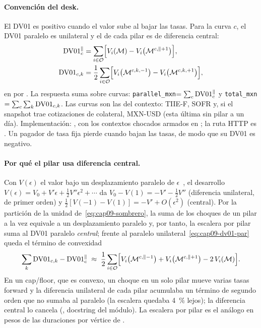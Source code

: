 \paragraph{Convención del desk.} El DV01 es positivo cuando el valor sube al bajar las tasas. Para la curva $c$, el DV01 paralelo es unilateral y el de cada pilar es de diferencia central:
\begin{align}
  \mathrm{DV01}^{\parallel}_c&=\sum_{i\in\mathcal O}\Bigl[V_i(\mathcal M)-V_i\bigl(\mathcal M^{c,\parallel+1}\bigr)\Bigr],\label{eq:cap09-dv01-par}\\
  \mathrm{DV01}_{c,k}&=\frac12\sum_{i\in\mathcal O}\Bigl[V_i\bigl(\mathcal M^{c,k,-1}\bigr)-V_i\bigl(\mathcal M^{c,k,+1}\bigr)\Bigr],\label{eq:cap09-dv01-pilar}
\end{align}
en \MXN{} por \pb. La respuesta suma sobre curvas: \texttt{parallel\_mxn}$=\sum_c\mathrm{DV01}^{\parallel}_c$ y \texttt{total\_mxn}$=\sum_c\sum_k\mathrm{DV01}_{c,k}$. Las curvas son las del contexto: TIIE-F, SOFR y, si el snapshot trae cotizaciones de colateral, MXN-USD (esta última sin pilar a un día). Implementación: , con los contextos chocados armados en ; la ruta HTTP es . Un pagador de tasa fija pierde cuando bajan las tasas, de modo que su DV01 es negativo.

\paragraph{Por qué el pilar usa diferencia central.} Con $V(\epsilon)$ el valor bajo un desplazamiento paralelo de $\epsilon$~\pb, el desarrollo $V(\epsilon)=V_0+V'\epsilon+\tfrac12V''\epsilon^2+\cdots$ da $V_0-V(1)=-V'-\tfrac12V''$ (diferencia unilateral, de primer orden) y $\tfrac12[V(-1)-V(1)]=-V'+O(\epsilon^2)$ (central). Por la partición de la unidad de~\eqref{eq:cap09-sombrero}, la suma de los choques de un pilar a la vez equivale a un desplazamiento paralelo y, por tanto, la escalera por pilar suma al DV01 paralelo \emph{central}; frente al paralelo unilateral~\eqref{eq:cap09-dv01-par} queda el término de convexidad
\begin{equation}\label{eq:cap09-convexidad}
  \sum_k\mathrm{DV01}_{c,k}-\mathrm{DV01}^{\parallel}_c\;\approx\;\frac12\sum_{i\in\mathcal O}\Bigl[V_i\bigl(\mathcal M^{c,\parallel-1}\bigr)+V_i\bigl(\mathcal M^{c,\parallel+1}\bigr)-2\,V_i(\mathcal M)\Bigr].
\end{equation}
En un cap/floor, que es convexo, un choque en un solo pilar mueve varias tasas forward y la diferencia unilateral de cada pilar acumulaba un término de segundo orden que no sumaba al paralelo (la escalera quedaba 4~\% lejos); la diferencia central lo cancela (, docstring del módulo). La escalera por pilar es el análogo en pesos de las duraciones por vértice de \citet{ho1992}.

